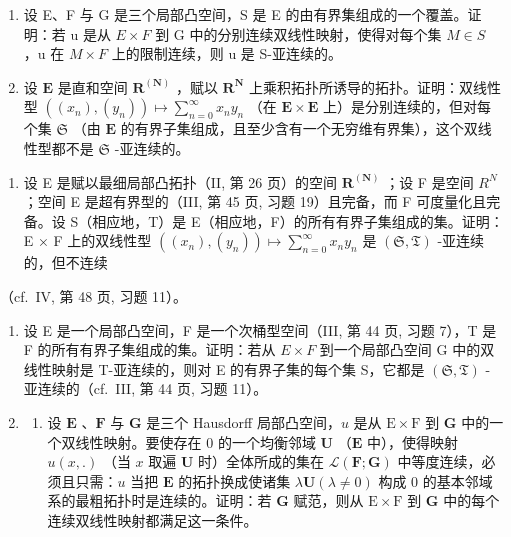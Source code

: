 \exercisegroup

\begin{enumerate}
\def\labelenumi{\arabic{enumi})}
\item
  设 E、F 与 G 是三个局部凸空间，S 是 E 的由有界集组成的一个覆盖。证明：若 u 是从 \(E \times F\) 到 G 中的分别连续双线性映射，使得对每个集 \(M \in S\) ，u 在 \(M \times F\) 上的限制连续，则 u 是 S-亚连续的。
\item
  设 \(\mathbf{E}\) 是直和空间 \(\mathbf{R}^{(\mathbf{N})}\) ，赋以 \(\mathbf{R}^{\mathbf{N}}\) 上乘积拓扑所诱导的拓扑。证明：双线性型 \(((x_n), (y_n)) \mapsto \sum_{n=0}^{\infty} x_n y_n\) （在 \(\mathbf{E} \times \mathbf{E}\) 上）是分别连续的，但对每个集 \(\mathfrak{S}\) （由 \(\mathbf{E}\) 的有界子集组成，且至少含有一个无穷维有界集），这个双线性型都不是 \(\mathfrak{S}\) -亚连续的。
\end{enumerate}


\begin{enumerate}
\def\labelenumi{\arabic{enumi})}
\setcounter{enumi}{2}
\tightlist
\item
  设 E 是赋以最细局部凸拓扑（II, 第 26 页）的空间 \(\mathbf{R}^{(\mathbf{N})}\) ；设 F 是空间 \(R^{N}\) ；空间 E 是超有界型的（III, 第 45 页, 习题 19）且完备，而 F 可度量化且完备。设 S（相应地，T）是 E（相应地，F）的所有有界子集组成的集。证明：E × F 上的双线性型 \(((x_{n}), (y_{n})) \mapsto \sum_{n=0}^{\infty} x_{n} y_{n}\) 是 \((\mathfrak{S}, \mathfrak{T})\) -亚连续的，但不连续
\end{enumerate}

（cf.~IV, 第 48 页, 习题 11）。

\begin{enumerate}
\def\labelenumi{\arabic{enumi})}
\setcounter{enumi}{3}
\item
  设 E 是一个局部凸空间，F 是一个次桶型空间（III, 第 44 页, 习题 7），T 是 F 的所有有界子集组成的集。证明：若从 \(E \times F\) 到一个局部凸空间 G 中的双线性映射是 T-亚连续的，则对 E 的有界子集的每个集 S，它都是 \((\mathfrak{S}, \mathfrak{T})\) -亚连续的（cf.~III, 第 44 页, 习题 11）。
\item
  \begin{enumerate}
  \def\labelenumii{\alph{enumii})}
  \tightlist
  \item
    设 \(\mathbf{E}\) 、\(\mathbf{F}\) 与 \(\mathbf{G}\) 是三个 Hausdorff 局部凸空间，\(u\) 是从 \(\mathrm{E} \times \mathrm{F}\) 到 \(\mathbf{G}\) 中的一个双线性映射。要使存在 0 的一个均衡邻域 \(\mathbf{U}\) （\(\mathbf{E}\) 中），使得映射 \(u(x, .)\) （当 \(x\) 取遍 \(\mathbf{U}\) 时）全体所成的集在 \(\mathcal{L}(\mathbf{F}; \mathbf{G})\) 中等度连续，必须且只需：\(u\) 当把 \(\mathbf{E}\) 的拓扑换成使诸集 \(\lambda \mathbf{U} (\lambda \neq 0)\) 构成 0 的基本邻域系的最粗拓扑时是连续的。证明：若 \(\mathbf{G}\) 赋范，则从 \(\mathrm{E} \times \mathrm{F}\) 到 \(\mathbf{G}\) 中的每个连续双线性映射都满足这一条件。
  \end{enumerate}
\end{enumerate}

